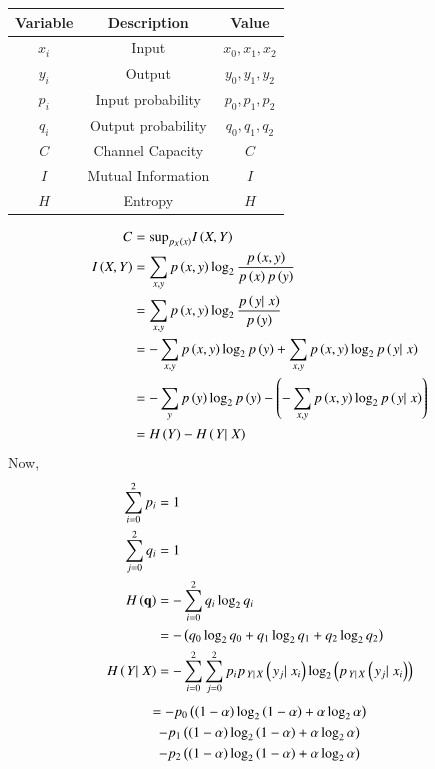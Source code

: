 \documentclass[journal,12pt,twocolumn]{IEEEtran}
\theoremstyle{remark}
\begin{document}
\begin{tabular}{|c|c|c|} \hline
Variable & Description & Value\\\hline
$x_i$ & Input & $x_0 , x_1, x_2$\\\hline
$y_i$ & Output & $y_0 , y_1, y_2$\\\hline
$p_i$ & Input probability & $ p_0, p_1, p_2 $\\\hline
$q_i$ & Output probability & $  q_0, q_1, q_2 $\\\hline
$C$ & Channel Capacity & $C$\\\hline
$I$ & Mutual Information & $I$ \\\hline
$H$ & Entropy & $H$ \\\hline
\end{tabular}
\begin{align}
C &=\text{sup}_{p_X\brak{x}} I\brak{X,Y}\\
I\brak{X,Y} &= \sum_{x,y}p\brak{x,y}\log_2\frac{p\brak{x,y}}{p\brak{x}p\brak{y}}\\
&= \sum_{x,y}p\brak{x,y}\log_2\frac{p\brak{\left.{y}|\right.{x}}}{p\brak{y}}\\
&=-\sum_{x,y}p\brak{x,y}\log_2p\brak{y}+\sum_{x,y}p\brak{x,y}\log_2p\brak{\left.{y}|\right.{x}}\\
&=-\sum_{y}p\brak{y}\log_2p\brak{y}-\brak{-\sum_{x,y}p\brak{x,y}\log_2p\brak{\left.{y}|\right.{x}}}\\
&= H\brak{Y} - H\brak{\left.{Y}|\right.{X}}\label{eq/Gate/61:1}
\end{align}
Now,
\begin{align}
\sum_{i=0}^2p_i&=1\\
 \sum_{j=0}^2q_i&=1\\
H\brak{\vec{q}} &= - \sum_{i=0}^2 q_i\log_2 q_i\\
&= -\brak{q_0\log_2 q_0 + q_1\log_2 q_1 +q_2\log_2 q_2}\label{eq/Gate/61:2}\\
H\brak{\left.{Y}|\right.{X}} &= -\sum_{i=0}^2 \sum_{j=0}^2p_ip_{\left.{Y}|\right.{X}}\brak{{\left.{y_j}|\right.{x_i}}}\log_2\brak{p_{\left.{Y}|\right.{X}}\brak{{\left.{y_j}|\right.{x_i}}}}
\end{align}
\begin{multline}
= -p_0\brak{\brak{1-\alpha} \log_2 \brak{1-\alpha} + \alpha \log_2 \alpha}\\-p_1\brak{\brak{1-\alpha} \log_2 \brak{1-\alpha} + \alpha \log_2 \alpha}\\-p_2\brak{\brak{1-\alpha} \log_2 \brak{1-\alpha} + \alpha \log_2 \alpha}\label{eq/Gate/61:3}
\end{multline}
\end{document}
